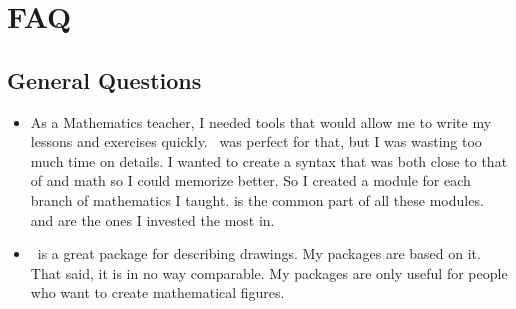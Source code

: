 \section{FAQ}

\subsection{General Questions}
\begin{itemize}\setlength{\itemsep}{10pt} 
\item {} As a Mathematics teacher, I needed tools that would allow me to write my lessons and exercises quickly. \TIKZ\ was perfect for that, but I was wasting too much time on details. I wanted to create a syntax that was both close to that of \LATEX and math so I could memorize better. So I created a module for each branch of mathematics I taught.  is the common part of all these modules.  and  are the ones I invested the most in.
    
\item  {} \TIKZ\ is a great package for describing drawings. My packages are based on it. That said, it is in no way comparable. My packages are only useful for people who want to create mathematical figures.
\end{itemize} 
     
